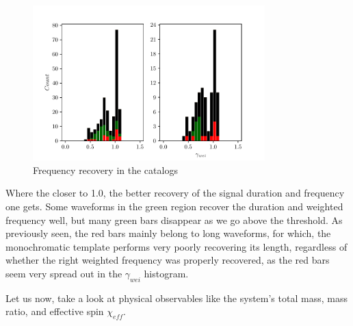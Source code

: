 \begin{figure}[hbt!]
\begin{center}
\includegraphics[width=0.8\textwidth, angle=0]{images/Data_analysis/results/alpha_gammahist.pdf}
\caption{Frequency recovery in the catalogs}
\label{aghist}
\end{center}
\end{figure}
\FloatBarrier

Where the closer to 1.0, the better recovery of the signal duration and frequency one gets. Some waveforms in the green region recover the duration and weighted frequency well, but many green bars disappear as we go above the threshold. As previously seen, the red bars mainly belong to long waveforms, for which, the monochromatic template performs very poorly recovering its length, regardless of whether the right weighted frequency was properly recovered, as the red bars seem very spread out in the $\gamma_{wei}$ histogram. 

\newpage

Let us now, take a look at physical observables like the system's total mass, mass ratio, and effective spin $\chi_{eff}$.  

